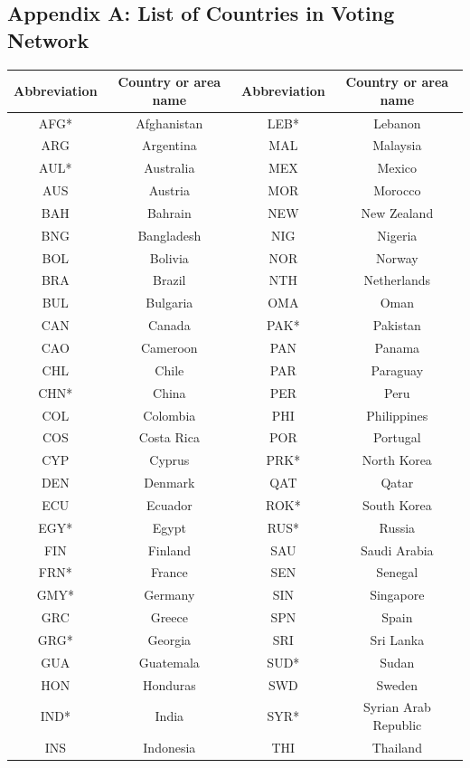 \documentclass[a4paper]{article}
\begin{document}
\subsection*{Appendix A: List of Countries in Voting Network}
\begin{table}[H]
	\centering
\begin{tabular}{c|c||c|c}
	\hline
	Abbreviation&Country or area name &	Abbreviation&Country or area name\\
	\hline
			AFG* & Afghanistan & LEB* & Lebanon\\
			ARG& Argentina&MAL&Malaysia\\
			AUL* & Australia&MEX &Mexico \\
			AUS & Austria&MOR & Morocco\\
			BAH & Bahrain&NEW & New Zealand \\
			BNG&  Bangladesh&NIG &      Nigeria\\
			BOL& Bolivia&NOR &Norway \\
			BRA &Brazil&NTH &  Netherlands\\
			BUL & Bulgaria&OMA & Oman\\
				CAN & Canada&PAK* & Pakistan\\
			CAO & Cameroon&PAN & Panama\\
			CHL & Chile&PAR & Paraguay\\
				CHN* & China&PER & Peru\\
				COL & Colombia&PHI & Philippines\\
				COS & Costa Rica&POR & Portugal\\
				CYP & Cyprus&PRK* & North Korea\\
				DEN & Denmark&QAT & Qatar\\
				ECU &Ecuador &ROK* & South Korea\\
				EGY* & Egypt&RUS* & Russia\\
				FIN & Finland&SAU & Saudi Arabia\\
				FRN* & France&SEN &Senegal \\
				GMY* & Germany&SIN &Singapore \\
				GRC & Greece&SPN & Spain\\
				GRG* & Georgia&SRI &   Sri Lanka\\
				GUA &Guatemala&SUD* &Sudan\\
				HON &Honduras&SWD &    Sweden\\
				IND* & India&SYR* & Syrian Arab Republic \\
				INS & Indonesia&THI &   Thailand\\

\end{tabular}
\end{table}
\end{document}
